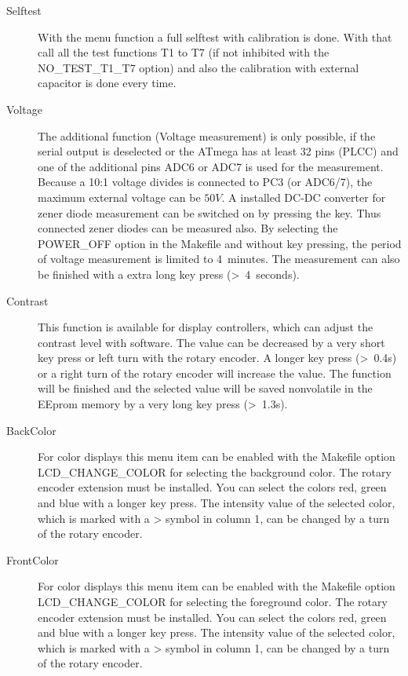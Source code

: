\begin{description}
\item[Selftest]
With the menu function  a full selftest with calibration is done.
With that call all the test functions T1 to T7 (if not inhibited with the NO\_TEST\_T1\_T7 option) 
and also the calibration with external capacitor is done every time.\\

\item[Voltage]
The additional function  (Voltage measurement) is only possible, if the serial output is deselected
or the ATmega has at least 32 pins (PLCC) and one of the additional pins ADC6 or ADC7 is used for the measurement.
Because a 10:1 voltage divides is connected to PC3 (or ADC6/7), the maximum external voltage can be \(50V\).
A installed DC-DC converter for zener diode measurement can be switched on by pressing the key.
Thus connected zener diodes can be measured also.
By selecting the POWER\_OFF option in the Makefile and without key pressing, the period of voltage measurement is limited to 4~minutes.
The measurement can also be finished with a extra long key press (\textgreater~4~seconds).

\item[Contrast] 
This function is available for display controllers, which can adjust the contrast level with software.
The value can be decreased by a very short key press or left turn with the rotary encoder.
A longer key press (\textgreater~0.4s) or a right turn of the rotary encoder will increase the value.
The function will be finished and the selected value will be saved nonvolatile in the EEprom memory 
by a very long key press (\textgreater~1.3s).

\item[BackColor]
For color displays this menu item can be enabled with the Makefile option LCD\_\discretionary{}{}{}CHANGE\_\discretionary{}{}{}COLOR 
for selecting the background color. The rotary encoder extension must be installed.
You can select the colors red, green and blue with a longer key press. The intensity value of the
selected color, which is marked with a {\textgreater} symbol in column 1, can be changed by a turn of the rotary encoder.

\item[FrontColor]
For color displays this menu item can be enabled with the Makefile option LCD\_\discretionary{}{}{}CHANGE\_\discretionary{}{}{}COLOR 
for selecting the foreground color. The rotary encoder extension must be installed.
You can select the colors red, green and blue with a longer key press. The intensity value of the
selected color, which is marked with a {\textgreater} symbol in column 1, can be changed by a turn of the rotary encoder.


\end{description}
